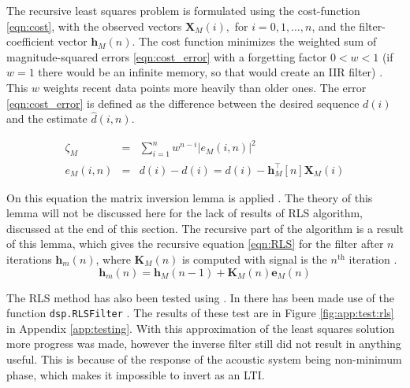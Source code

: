 The recursive least squares problem is formulated using the cost-function \eqref{eqn:cost}, with the observed vectors $\mathbf{X}_M(i),$ for $i=0,1,\ldots,n$, and the filter-coefficient vector $\mathbf{h}_M(n)$.
The cost function minimizes the weighted sum of magnitude-squared errors \eqref{eqn:cost_error} with a forgetting factor $0<w<1$ (if $w=1$ there would be an infinite memory, so that would create an IIR filter) \cite[p.~564]{book:adaptivefiltertheory}.
This $w$ weights recent data points more heavily than older ones.
The error \eqref{eqn:cost_error} is defined as the difference between the desired sequence $d(i)$ and the estimate $\hat{d}(i,n)$.

\begin{eqnarray}
\label{eqn:cost}\zeta_M&=&\sum\limits_{i=1}^nw^{n-i}|e_M(i,n)|^2\\
\label{eqn:cost_error}e_M(i,n)&=&d(i)-\hat{d}(i)=d(i)-\mathbf{h}^\intercal_M[n]\mathbf{X}_M(i)
\end{eqnarray}

On this equation the matrix inversion lemma is applied \cite[p.~565]{book:adaptivefiltertheory}.
The theory of this lemma will not be discussed here for the lack of results of RLS algorithm, discussed at the end of this section.
The recursive part of the algorithm is a result of this lemma, which gives the recursive equation \eqref{eqn:RLS} for the filter after $n$ iterations $\mathbf{h}_m(n)$, where $\mathbf{K}_M(n)$ is computed with signal is the $n^\text{th}$ iteration \cite[p.~569]{book:adaptivefiltertheory} \cite[p.~870]{book:dsp}.
\begin{equation}
\label{eqn:RLS}
\mathbf{h}_m(n)=\mathbf{h}_M(n-1)+\mathbf{K}_M(n)\mathbf{e}_M(n)
\end{equation}

The RLS method has also been tested using \matlab.
In {\matlab} there has been made use of the function \texttt{dsp.RLSFilter} \cite{matlab:rls,matlab:rls1}.
The results of these test are in Figure \ref{fig:app:test:rls} in Appendix \ref{app:testing}.
With this approximation of the least squares solution more progress was made, however the inverse filter still did not result in anything useful.
This is because of the response of the acoustic system being non-minimum phase, which makes it impossible to invert as an LTI.

